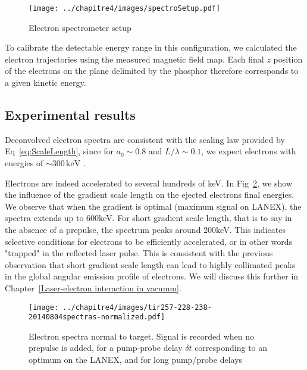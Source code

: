 \begin{figure}[H]
\centering
\texttt{[image: ../chapitre4/images/spectroSetup.pdf]}\\
\caption{\label{fig:spectroSetup} Electron spectrometer setup}
\end{figure}


\noindent To calibrate the detectable energy range in this configuration, we calculated the electron trajectories using the measured magnetic field map. Each final $z$ position of the electrons on the plane delimited by the phosphor therefore corresponds to a given kinetic energy. 


\subsection{Experimental results}

\noindent Deconvolved electron spectra are consistent with the scaling law provided by Eq~\ref{eq:ScaleLength}, since for $a_0 \sim 0.8$ and $L/\lambda \sim 0.1$, we expect electrons with energies of $\sim 300\,\mathrm{keV}$ .\\

\noindent {}

\noindent Electrons are indeed accelerated to several hundreds of keV. In Fig~\ref{fig:tir257-228-238-20140804spectras-normalized}, we show the influence of the gradient scale length on the ejected electrons final energies. We observe that when the gradient is optimal (maximum signal on LANEX), the spectra extends up to 600keV. For short gradient scale length, that is to say in the absence of a prepulse, the spectrum peaks around 200keV. This indicates selective conditions for electrons to be efficiently accelerated, or in other words "trapped" in the reflected laser pulse. This is consistent with the previous observation that short gradient scale length can lead to highly collimated peaks in the global angular emission profile of electrons. We will discuss this further in Chapter~\ref{Laser-electron interaction in vacumm}.

\begin{figure}[H]
\centering
\texttt{[image: ../chapitre4/images/tir257-228-238-20140804spectras-normalized.pdf]}\\
\caption{\label{fig:tir257-228-238-20140804spectras-normalized} Electron spectra normal to target. Signal is recorded when no prepulse is added, for a pump-probe delay $\delta t$ corresponding to an optimum on the LANEX, and for long pump/probe delays}
\end{figure}

